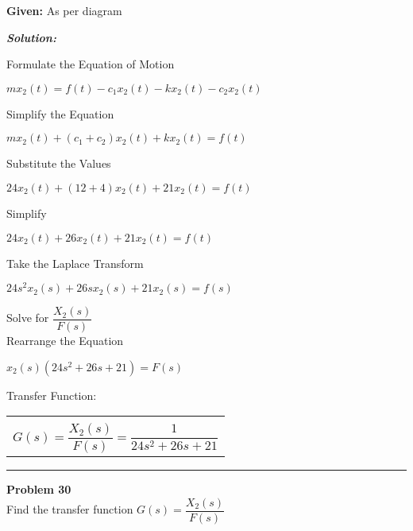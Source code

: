 \documentclass[11pt,letterpaper]{article}
\begin{document}
\noindent\textbf{Given:} As per diagram

\vspace{12pt}
\noindent\textit{\textbf{Solution:}}

\vspace{12pt}

Formulate the Equation of Motion\\
\begin{center}
	$mx_2(t)=f(t)-c_1x_2(t)-kx_2(t)-c_2x_2(t)$\\
\end{center}
Simplify the Equation\\
\begin{center}
	$mx_2(t)+(c_1+c_2)x_2(t)+kx_2(t)=f(t)$\\
\end{center}
Substitute the Values\\
\begin{center}
	$24x_2(t)+(12+4)x_2(t)+21x_2(t)=f(t)$\\
\end{center}
Simplify\\
\begin{center}
	$24x_2(t)+26x_2(t)+21x_2(t)=f(t)$\\
\end{center}
Take the Laplace Transform\\
\begin{center}
	$24s^2x_2(s)+26sx_2(s)+21x_2(s)=f(s)$\\
\end{center}
Solve for $\dfrac{X_2(s)}{F(s)}$\\[12pt]
Rearrange the Equation\\
\begin{center}
	$x_2(s)(24s^2+26s+21)=F(s)$\\
\end{center}
Transfer Function:\\
\begin{center}
	\begin{tabular}{|c|}
		\hline \\
		$G(s)=\dfrac{X_2(s)}{F(s)}=\dfrac{1}{24s^2+26s+21}$	\\ [12pt]
	\hline
	\end{tabular}	
\end{center}

\clearpage

\rule{\textwidth}{1pt}
\textbf{Problem 30}\\
Find the transfer function $G(s)=\dfrac{X_2(s)}{F(s)}$\\
\end{document}
